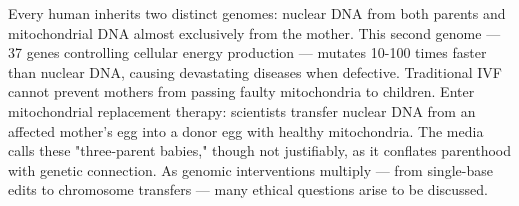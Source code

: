 Every human inherits two distinct genomes: nuclear DNA from both parents and mitochondrial DNA almost exclusively from the mother. This second genome — 37 genes controlling cellular energy production — mutates 10-100 times faster than nuclear DNA, causing devastating diseases when defective. Traditional IVF cannot prevent mothers from passing faulty mitochondria to children. Enter mitochondrial replacement therapy: scientists transfer nuclear DNA from an affected mother's egg into a donor egg with healthy mitochondria. The media calls these "three-parent babies," though not justifiably, as it conflates parenthood with genetic connection. As genomic interventions multiply — from single-base edits to chromosome transfers — many ethical questions arise to be discussed.